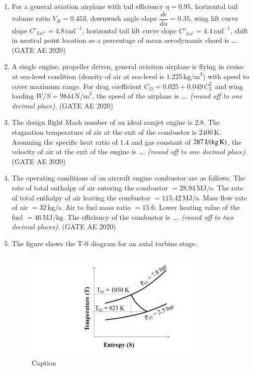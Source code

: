 \documentclass[journal,12pt,onecolumn]{IEEEtran}
\theoremstyle{remark}
\begin{document}
\begin{enumerate}
\item For a general aviation airplane with tail efficiency $\eta = 0.95$, horizontal tail volume ratio $V_{H} = 0.453$, downwash angle slope $\dfrac{d\epsilon}{d\alpha} = 0.35$, wing lift curve slope $C'_{L\alpha^w} = 4.8\,\text{rad}^{-1}$, horizontal tail lift curve slope $C'_{L\alpha^t} = 4.4\,\text{rad}^{-1}$, shift in neutral point location as a percentage of mean aerodynamic chord is \dots. 
\hfill(GATE AE 2020)

\item A single engine, propeller driven, general aviation airplane is flying in cruise at sea-level condition (density of air at sea-level is $1.225\,\text{kg/m}^3$) with speed to cover maximum range. For drag coefficient $C_D = 0.025 + 0.049\,C_L^2$ and wing loading $W/S = 9844\,\text{N/m}^2$, the speed of the airplane is \dots {}. \textit{(round off to one decimal place).}
\hfill(GATE AE 2020)

\item The design flight Mach number of an ideal ramjet engine is $2.8$. The stagnation temperature of air at the exit of the combustor is $2400\,\text{K}$. Assuming the specific heat ratio of $1.4$ and gas constant of $287\,\text{J/(kg\,K)}$, the velocity of air at the exit of the engine is \dots {}. \textit{(round off to one decimal place).}
\hfill(GATE AE 2020)

\item The operating conditions of an aircraft engine combustor are as follows. The rate of total enthalpy of air entering the combustor $= 28.94\,\text{MJ/s}$. The rate of total enthalpy of air leaving the combustor $= 115.42\,\text{MJ/s}$. Mass flow rate of air $= 32\,\text{kg/s}$. Air to fuel mass ratio $= 15.6$. Lower heating value of the fuel $= 46\,\text{MJ/kg}$. 
The efficiency of the combustor is \dots. \textit{(round off to two decimal places).}
\hfill(GATE AE 2020)

\item The figure shows the T-S diagram for an axial turbine stage.

\begin{figure}[H]
    \centering
    \includegraphics[width=0.5\columnwidth]{figs/Screenshot from 2025-08-19 16-14-00.png}
    \caption{Caption}
    \label{fig:placeholder}
\end{figure}


\end{enumerate}
\end{document}
